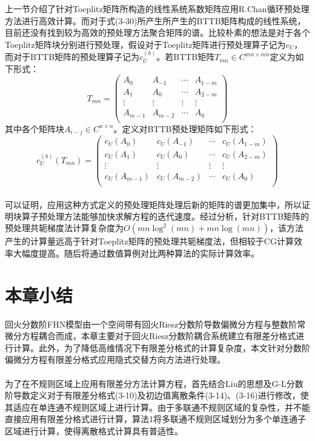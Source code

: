 \documentclass[twoside,UTF8]{nputhesis}
\newcommand{\upcite}[1]{\textsuperscript{\textsuperscript{\cite{#1}}}}
\begin{document}
上一节介绍了针对Toeplitz矩阵所构造的线性系统系数矩阵应用R.Chan循环预处理方法进行高效计算。而对于式(3-30)所产生所产生的BTTB矩阵构成的线性系统，目前还没有找到较为高效的预处理方法聚合矩阵的谱。比较朴素的想法是对于各个Toeplitz矩阵块分别进行预处理，假设对于Toeplitz矩阵进行预处理算子记为${{c}_{U}}$，而对于BTTB矩阵的预处理算子记为$c_{U}^{(b)}$。若BTTB矩阵${{T}_{mn}}\in {{C}^{mn\times mn}}$定义为如下形式：
\[{{T}_{mn}}=\left( \begin{matrix}
{{A}_{0}} & {{A}_{-1}} & \cdots  & {{A}_{1-m}}  \\
{{A}_{1}} & {{A}_{0}} & \cdots  & {{A}_{2-m}}  \\
\vdots  & \vdots  & \vdots  & \vdots   \\
{{A}_{m-1}} & {{A}_{m-2}} & \cdots  & {{A}_{0}}  \\
\end{matrix} \right)\]
其中各个矩阵块${{A}_{i-j}}\in {{C}^{n\times n}}$。定义对BTTB预处理矩阵如下形式：
\[c_{U}^{\left( b \right)}({{T}_{mn}})=\left( \begin{matrix}
{{c}_{U}}({{A}_{0}}) & {{c}_{U}}({{A}_{-1}}) & \cdots  & {{c}_{U}}({{A}_{1-m}})  \\
{{c}_{U}}({{A}_{1}}) & {{c}_{U}}({{A}_{0}}) & \cdots  & {{c}_{U}}({{A}_{2-m}})  \\
\vdots  & \vdots  & \vdots  & \vdots   \\
{{c}_{U}}({{A}_{m-1}}) & {{c}_{U}}({{A}_{m-2}}) & \cdots  & {{c}_{U}}({{A}_{0}})  \\
\end{matrix} \right)\]

可以证明，应用这种方式定义的预处理矩阵处理后新的矩阵的谱更加集中\upcite{chan1992family}，所以证明块算子预处理方法能够加快求解方程的迭代速度。经过分析，针对BTTB矩阵的预处理共轭梯度法计算复杂度为$O(mn{{\log }^{2}}(mn)+mn\log (mn))$，该方法产生的计算量远高于针对Toeplitz矩阵的预处理共轭梯度法，但相较于CG计算效率大幅度提高。随后将通过数值算例对比两种算法的实际计算效率。

\section{本章小结}
回火分数阶FHN模型由一个空间带有回火Riesz分数阶导数偏微分方程与整数阶常微分方程耦合而成，本章主要对于回火Riesz分数阶耦合系统建立有限差分格式进行计算。此外，为了降低高维情况下有限差分格式的计算复杂度，本文针对分数阶偏微分方程有限差分格式应用隐式交替方向方法进行处理。

为了在不规则区域上应用有限差分方法计算方程，首先结合Liu的思想\upcite{liu2015semi}及G-L分数阶导数定义对于有限差分格式(3-10)及初边值离散条件(3-14)、(3-16)进行修改，使其适应在单连通不规则区域上进行计算。由于多联通不规则区域的复杂性，并不能直接应用有限差分格式进行计算，算法1将多联通不规则区域划分为多个单连通子区域进行计算，使得离散格式计算具有普适性。
\end{document}
